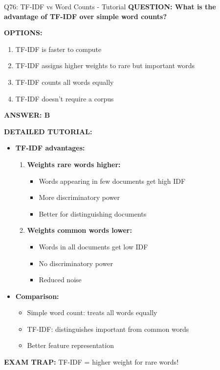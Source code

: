 \documentclass[8pt]{beamer}
\begin{document}
	\begin{frame}{Q76: TF-IDF vs Word Counts - Tutorial}
		\fontsize{6.5}{7.5}\selectfont
		\textbf{QUESTION: What is the advantage of TF-IDF over simple word counts?}
		
		\vspace{0.1cm}
		\textbf{OPTIONS:}
		\begin{enumerate}
			\item TF-IDF is faster to compute
			\item TF-IDF assigns higher weights to rare but important words
			\item TF-IDF counts all words equally
			\item TF-IDF doesn't require a corpus
		\end{enumerate}
		
		\vspace{0.1cm}
		\textcolor{myblue}{\textbf{ANSWER: B}}
		
		\vspace{0.1cm}
		\textbf{DETAILED TUTORIAL:}
		\begin{itemize}
			\item \textbf{TF-IDF advantages:}
			\begin{enumerate}
				\item \textbf{Weights rare words higher:}
				\begin{itemize}
					\item Words appearing in few documents get high IDF
					\item More discriminatory power
					\item Better for distinguishing documents
				\end{itemize}
				\item \textbf{Weights common words lower:}
				\begin{itemize}
					\item Words in all documents get low IDF
					\item No discriminatory power
					\item Reduced noise
				\end{itemize}
			\end{enumerate}
			\item \textbf{Comparison:}
			\begin{itemize}
				\item Simple word count: treats all words equally
				\item TF-IDF: distinguishes important from common words
				\item Better feature representation
			\end{itemize}
		\end{itemize}
		
		\textcolor{myred}{\textbf{EXAM TRAP:}} TF-IDF = \textcolor{myblue}{higher weight for rare words}!
	\end{frame}
	
\end{document}
